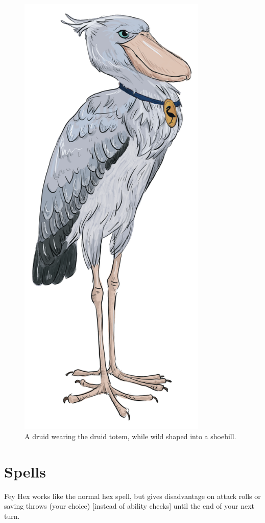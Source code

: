 \documentclass[letter,10pt,twocolumn,openany]{dndbook}
\begin{document}
\begin{figure}
    \includegraphics[width=9cm]{images/shoebill.png}
    \caption{A druid wearing the druid totem, while wild shaped into a shoebill.}
\end{figure}

\chapter{Spells}

Fey Hex works like the normal hex spell, but gives disadvantage on attack rolls or saving throws (your choice) [instead of ability checks] until the end of your next turn.
\end{document}
